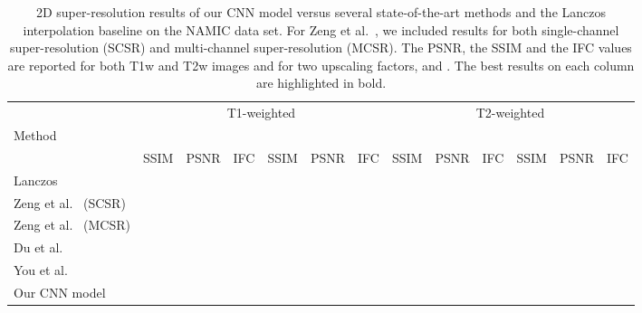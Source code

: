 \documentclass{ieeeaccess}
\begin{document}
\begin{table*}[!t]
\caption{2D super-resolution results of our CNN model versus several state-of-the-art methods \cite{Du-AS-2019,You-TMI-2019,ZENG-CBM-2018} and the Lanczos interpolation baseline on the NAMIC data set. For Zeng et al.~\cite{ZENG-CBM-2018}, we included results for both single-channel super-resolution (SCSR) and multi-channel super-resolution (MCSR). The PSNR, the SSIM and the IFC values are reported for both T1w and T2w images and for two upscaling factors,  and . The best results on each column are highlighted in bold.}\label{tab_namic_results_2D}
\begin{center}
\begin{tabular}{|l|c|c|c|c|c|c|c|c|c|c|c|c|}
\hline 
  & \multicolumn{6}{|c|}{T1-weighted} & \multicolumn{6}{|c|}{T2-weighted}\\
\cline{2-13}
Method        							& \multicolumn{3}{|c|}{} & \multicolumn{3}{|c|}{} & \multicolumn{3}{|c|}{} & \multicolumn{3}{|c|}{}\\
\cline{2-13}   												& SSIM         & PSNR      & IFC			& SSIM        & PSNR & IFC    & SSIM           & PSNR & IFC          & SSIM           & PSNR & IFC\\
\hline  
\hline   
Lanczos														&  &  &  &  &   &  &  &  &  &  &  & \\
\hline
Zeng et al.~\cite{ZENG-CBM-2018} (SCSR)	&  &  &  &  &  &  &   &  &   &  &   & \\  
\hline 
Zeng et al.~\cite{ZENG-CBM-2018} (MCSR)	&  &  &  &  &  &  &   &  &   &  &   & \\  
\hline 
Du et al.~\cite{Du-AS-2019}						&  &  &  &  &  &  &   &  &   &  &   & \\
\hline
You et al.~\cite{You-TMI-2019}  				&   &  &   		&  &   &     	&   &  &   &   &  & \\
\hline 
Our CNN model            &  &  & 	&  &  &  &  &  &  &  &  & \\ 
\hline 
\end{tabular}
\end{center}
\end{table*}
\end{document}
